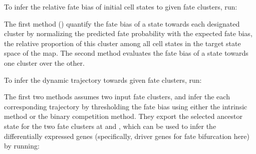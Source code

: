 \documentclass[letterpaper,10pt,english]{sphinxmanual}
\begin{document}
\begin{sphinxVerbatim}[commandchars=\\\{\}]
\end{sphinxVerbatim}

To infer the relative fate bias of initial cell states to given fate clusters, run:

\begin{sphinxVerbatim}[commandchars=\\\{\}]
\end{sphinxVerbatim}

The first method () quantify the fate bias of a state towards each designated cluster by normalizing the predicted fate probability with the expected fate bias, the relative proportion of this cluster among all cell states in the target state space of the map. The second method evaluates the fate bias of a state towards one cluster over the other.

To infer the dynamic trajectory towards given fate clusters, run:

\begin{sphinxVerbatim}[commandchars=\\\{\}]
\end{sphinxVerbatim}

The first two methods assumes two input fate clusters, and infer the each corresponding trajectory by thresholding the fate bias using either the intrinsic method or the binary competition method. They export the selected ancestor state for the two fate clusters at  and , which can be used to infer the differentially expressed genes (specifically, driver genes for fate bifurcation here) by running:
\end{document}
